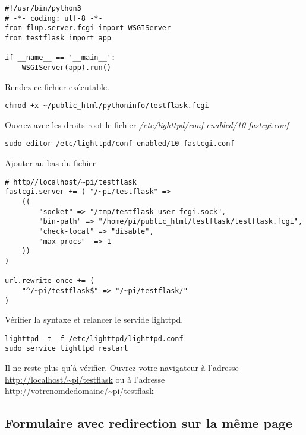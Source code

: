 \documentclass[a4paper,10pt,usenames]{article}
\begin{document}
\begin{list}{}{}
\begin{lstlisting}
#!/usr/bin/python3
# -*- coding: utf-8 -*-
from flup.server.fcgi import WSGIServer
from testflask import app

if __name__ == '__main__':
    WSGIServer(app).run()
\end{lstlisting}

Rendez ce fichier exécutable.

\begin{lstlisting}
chmod +x ~/public_html/pythoninfo/testflask.fcgi
\end{lstlisting}


Ouvrez avec les droits root le fichier   \textit{/etc/lighttpd/conf-enabled/10-fastcgi.conf} 

\begin{lstlisting}
sudo editor /etc/lighttpd/conf-enabled/10-fastcgi.conf
\end{lstlisting}

Ajouter au bas du fichier

\begin{lstlisting}
# http//localhost/~pi/testflask
fastcgi.server += ( "/~pi/testflask" =>
    ((
        "socket" => "/tmp/testflask-user-fcgi.sock",
        "bin-path" => "/home/pi/public_html/testflask/testflask.fcgi",
        "check-local" => "disable",
        "max-procs"  => 1
    ))
)

url.rewrite-once += (
    "^/~pi/testflask$" => "/~pi/testflask/"
)
\end{lstlisting}

Vérifier la syntaxe et relancer le servide lighttpd.  

\begin{lstlisting}
lighttpd -t -f /etc/lighttpd/lighttpd.conf
sudo service lighttpd restart
\end{lstlisting}

Il ne reste plus qu'à vérifier. Ouvrez votre navigateur à l'adresse \url{http://localhost/~pi/testflask}  ou à l'adresse \url{http://votrenomdedomaine/~pi/testflask}


\end{list}



\subsection{Formulaire avec redirection sur la même page}
\end{document}
